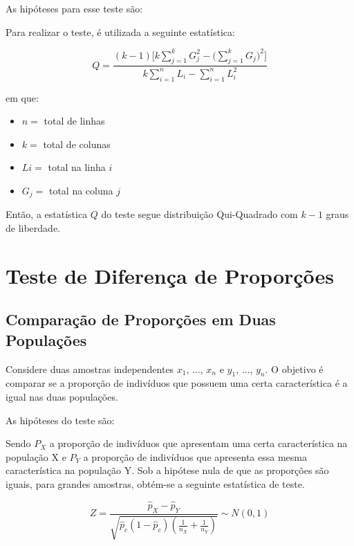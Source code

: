 \documentclass[
  portuguese,
]{estat/estat}
\providecommand{\tightlist}{%
  \setlength{\itemsep}{0pt}\setlength{\parskip}{0pt}}
\let\oldsection\section
\renewcommand\section{\clearpage\oldsection}
\begin{document}
As hipóteses para esse teste são:

Para realizar o teste, é utilizada a seguinte estatística:

\[ Q = \frac{(k - 1) \Bigg[k \displaystyle \sum_{j=1}^{k} G_{j}^{2} - \bigg(\displaystyle \sum_{j=1}^{k} G_{j} \bigg)^{2} \Bigg]}{k \displaystyle \sum_{i=1}^{n} L_{i} - \displaystyle \sum_{i=1}^{n} L_i^{2}} \]

em que:

\begin{itemize}
\tightlist
\item
  \(n =\) total de linhas
\item
  \(k =\) total de colunas
\item
  \(L{i} =\) total na linha \(i\)
\item
  \(G_{j} =\) total na coluna \(j\)
\end{itemize}

Então, a estatística \(Q\) do teste segue distribuição Qui-Quadrado com
\(k - 1\) graus de liberdade.

\section{Teste de Diferença de
Proporções}\label{teste-de-diferenuxe7a-de-proporuxe7uxf5es}

\subsection{Comparação de Proporções em Duas
Populações}\label{comparauxe7uxe3o-de-proporuxe7uxf5es-em-duas-populauxe7uxf5es}

Considere duas amostras independentes \(x_1,\, \ldots , \, x_n\) e
\(y_1,\, \ldots , \, y_n\). O objetivo é comparar se a proporção de
indivíduos que possuem uma certa característica é a igual nas duas
populações.

As hipóteses do teste são:


Sendo \(P_X\) a proporção de indivíduos que apresentam uma certa
característica na população X e \(P_Y\) a proporção de indivíduos que
apresenta essa mesma característica na população Y. Sob a hipótese nula
de que as proporções são iguais, para grandes amostras, obtém-se a
seguinte estatística de teste.

\[Z=\frac{\hat{p}_X-\hat{p}_Y}{\sqrt{\hat{p}_c(1-\hat{p}_c)\left(\frac{1}{n_X}+\frac{1}{n_Y}\right)}} \sim N(0,1)\]
\end{document}
